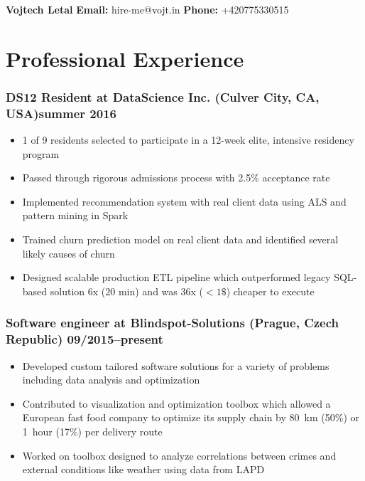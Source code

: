 \documentclass[10pt]{article}
\date{}
\begin{document}
\clearpage
\thispagestyle{empty}
{\center\bfseries\huge Vojtech Letal}
\hfill
{\bf Email:} hire-me@vojt.in
{\bf Phone:} +420775330515


\section*{Professional Experience}
\subsubsection*{\bf DS12 Resident at DataScience Inc. (Culver City, CA, USA)\hfill summer 2016}
	 \begin{itemize}
		\setlength\itemsep{-0.25em}
		\item 1 of 9 residents selected to participate in a 12-week elite, intensive residency program
		\item Passed through rigorous admissions process with 2.5\% acceptance rate
		\item Implemented recommendation system with real client data using ALS and pattern mining in Spark
		\item Trained churn prediction model on real client data and identified several likely causes of churn
		\item Designed scalable production ETL pipeline which outperformed legacy SQL-based solution 6x (20 min) and was 36x ($< 1\$$) cheaper to execute
	 \end{itemize}

\subsubsection*{\bf Software engineer at Blindspot-Solutions (Prague, Czech Republic) \hfill 09/2015--present}
	 \begin{itemize}
		\setlength\itemsep{-0.25em}
		\item Developed custom tailored software solutions for a variety of problems including data analysis and optimization
		\item Contributed to visualization and optimization toolbox which allowed a European fast food company to optimize its supply chain by 80~km (50\%) or 1~hour (17\%) per delivery route
		\item Worked on toolbox designed to analyze correlations between crimes and external conditions like weather using data from LAPD
	 \end{itemize}
\end{document}
